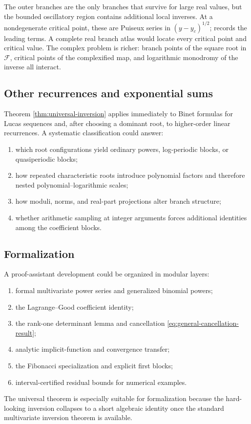 \documentclass[11pt,oneside]{article}
\theoremstyle{plain}
\theoremstyle{definition}
\theoremstyle{remark}
\newcommand{\Fcal}{\mathcal{F}}
\begin{document}
The outer branches are the only branches that survive for large real values,
but the bounded oscillatory region contains additional local inverses.  At a
nondegenerate critical point, these are Puiseux series in
\((y-y_c)^{1/2}\);  records the leading terms.  A
complete real branch atlas would locate every critical point and critical
value.  The complex problem is richer: branch points of the square root in
\(\Fcal\), critical points of the complexified map, and logarithmic monodromy
of the inverse all interact.

\subsection{Other recurrences and exponential sums}

Theorem \ref{thm:universal-inversion} applies immediately to Binet formulas
for Lucas sequences and, after choosing a dominant root, to higher-order linear
recurrences.  A systematic classification could answer:
\begin{enumerate}
\item which root configurations yield ordinary powers, log-periodic blocks,
or quasiperiodic blocks;
\item how repeated characteristic roots introduce polynomial factors and
therefore nested polynomial--logarithmic scales;
\item how moduli, norms, and real-part projections alter branch structure;
\item whether arithmetic sampling at integer arguments forces additional
identities among the coefficient blocks.
\end{enumerate}

\subsection{Formalization}

A proof-assistant development could be organized in modular layers:
\begin{enumerate}
\item formal multivariate power series and generalized binomial powers;
\item the Lagrange--Good coefficient identity;
\item the rank-one determinant lemma and cancellation
\eqref{eq:general-cancellation-result};
\item analytic implicit-function and convergence transfer;
\item the Fibonacci specialization and explicit first blocks;
\item interval-certified residual bounds for numerical examples.
\end{enumerate}
The universal theorem is especially suitable for formalization because the
hard-looking inversion collapses to a short algebraic identity once the
standard multivariate inversion theorem is available.
\end{document}
